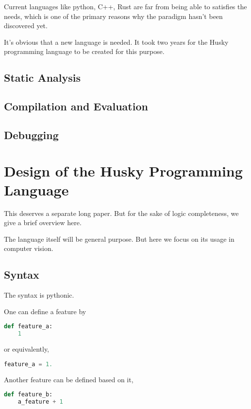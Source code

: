 \documentclass[11pt]{article} 	%
\theoremstyle{definition}
\begin{document}
Current languages like python, C++, Rust are far from being able to satisfies the needs, which is one of the primary reasons why the paradigm hasn't been discovered yet.

It's obvious that a new language is needed. It took two years for the Husky programming language to be created for this purpose.

\subsection{Static Analysis}

\subsection{Compilation and Evaluation}

\subsection{Debugging}


\section{Design of the Husky Programming Language}

This deserves a separate long paper. But for the sake of logic completeness, we give a brief overview here.

The language itself will be general purpose. But here we focus on its usage in computer vision.

\subsection{Syntax}

The syntax is pythonic.

One can define a feature by
\begin{lstlisting}[language=Python]
def feature_a:
    1
\end{lstlisting}

or equivalently,

\begin{lstlisting}[language=Python]
feature_a = 1.
\end{lstlisting}

Another feature can be defined based on it,

\begin{lstlisting}[language=Python]
def feature_b:
    a_feature + 1
\end{lstlisting}
\end{document}
